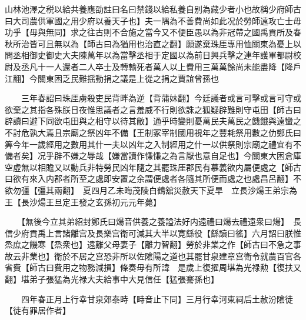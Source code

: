 山林池澤之税以給共養應劭註曰名曰禁錢以給私養自别為藏少者小也故稱少府師古曰大司農供軍國之用少府以養天子也】夫一隅為不善費尚如此况於勞師遠攻亡士毋功乎【毋與無同】求之往古則不合施之當今又不便臣愚以為非冠帶之國禹貢所及春秋所治皆可且無以為【師古曰為猶用也治直之翻】願遂棄珠厓專用恤關東為憂上以問丞相御史御史大夫陳萬年以為當擊丞相于定國以為前日興兵擊之連年護軍都尉校尉及丞凡十一人還者二人卒士及轉輸死者萬人以上費用三萬萬餘尚未能盡降【降戶江翻】今關東困乏民難揺動捐之議是上從之捐之賈誼曾孫也

　　三年春詔曰珠厓虜殺吏民背畔為逆【背蒲妹翻】今廷議者或言可擊或言可守或欲棄之其指各殊朕日夜惟思議者之言羞威不行則欲誅之狐疑辟難則守屯田【師古曰辟讀曰避下同欲屯田與之相守以待其敝】通乎時變則憂萬民夫萬民之饑餓與遠蠻之不討危孰大焉且宗廟之祭凶年不備【王制冢宰制國用視年之豐耗祭用數之仂鄭氏曰筭今年一歲經用之數用其什一夫以凶年之入制經用之什一以供祭則宗廟之禮宜有不備者矣】况乎辟不嫌之辱哉【嫌當讀作慊慊之為言厭也意自足也】今關東大困倉庫空虛無以相贍又以動兵非特勞民凶年隨之其罷珠厓郡民有慕義欲内屬便處之【師古曰欲有來入内郡者所至之處即安置之余謂便處者各隨其所便而處之也處昌呂翻】不欲勿彊【彊其兩翻】　夏四月乙未晦茂陵白鶴舘災赦天下夏旱　立長沙煬王弟宗為王【長沙煬王旦定王發之玄孫初元元年薨】

　　【無後今立其弟紹封鄭氏曰煬音供養之養謚法好内遠禮曰煬去禮遠衆曰煬】　長信少府貢禹上言諸離宫及長樂宫衛可減其大半以寛繇役【繇讀曰徭】六月詔曰朕惟烝庶之饑寒【烝衆也】遠離父母妻子【離力智翻】勞於非業之作【師古曰不急之事故云非業也】衛於不居之宫恐非所以佐隂陽之道也其罷甘泉建章宫衛令就農百官各省費【師古曰費用之物務減損】條奏毋有所諱　是歲上復擢周堪為光禄勲【復扶又翻】堪弟子張猛為光禄大夫給事中大見信任【猛張騫孫也】

　　四年春正月上行幸甘泉郊泰畤【畤音止下同】三月行幸河東祠后土赦汾隂徒【徒有罪居作者】

